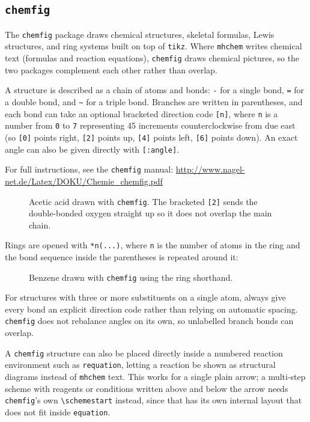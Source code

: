 	\subsection{\texttt{chemfig}}
	The \texttt{chemfig} package draws chemical structures, skeletal formulas, Lewis structures, and ring systems built on top of \texttt{tikz}. Where \texttt{mhchem} writes chemical text (formulas and reaction equations), \texttt{chemfig} draws chemical pictures, so the two packages complement each other rather than overlap.
	
	A structure is described as a chain of atoms and bonds: \texttt{-} for a single bond, \texttt{=} for a double bond, and \texttt{\textasciitilde} for a triple bond. Branches are written in parentheses, and each bond can take an optional bracketed direction code \texttt{[n]}, where \texttt{n} is a number from \texttt{0} to \texttt{7} representing 45\textdegree{} increments counterclockwise from due east (so \texttt{[0]} points right, \texttt{[2]} points up, \texttt{[4]} points left, \texttt{[6]} points down). An exact angle can also be given directly with \texttt{[:angle]}.
	
	For full instructions, see the \texttt{chemfig} manual: \url{http://www.nagel-net.de/Latex/DOKU/Chemie_chemfig.pdf}
	
	\begin{figure}[H]
		\centering
		\caption{Acetic acid drawn with \texttt{chemfig}. The bracketed \texttt{[2]} sends the double-bonded oxygen straight up so it does not overlap the main chain.}
		\label{fig:chemfig-acetic-acid}
	\end{figure}
	
	Rings are opened with \texttt{*n(...)}, where \texttt{n} is the number of atoms in the ring and the bond sequence inside the parentheses is repeated around it:
	
	\begin{figure}[H]
		\centering
		\caption{Benzene drawn with \texttt{chemfig} using the ring shorthand.}
		\label{fig:chemfig-benzene}
	\end{figure}
	
	For structures with three or more substituents on a single atom, always give every bond an explicit direction code rather than relying on automatic spacing. \texttt{chemfig} does not rebalance angles on its own, so unlabelled branch bonds can overlap.
	
	A \texttt{chemfig} structure can also be placed directly inside a numbered reaction environment such as \texttt{requation}, letting a reaction be shown as structural diagrams instead of \texttt{mhchem} text. This works for a single plain arrow; a multi-step scheme with reagents or conditions written above and below the arrow needs \texttt{chemfig}'s own \texttt{\textbackslash schemestart} instead, since that has its own internal layout that does not fit inside \texttt{equation}.
	
